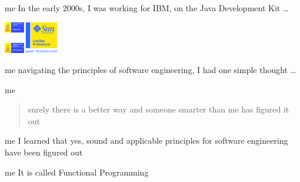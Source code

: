 \begin{frame}
\begin{block}{me}
In the early 2000s, I was working for IBM, on the Java Development Kit \ldots
\end{block}
\includegraphics[height=1.4cm]{image/java-certs.png}
\end{frame}

\begin{frame}
\begin{block}{me}
navigating the principles of software engineering, I had one simple thought \ldots
\end{block}
\end{frame}

\begin{frame}
\begin{block}{me}
\begin{quote}
surely there is a better way and someone smarter than me has figured it out
\end{quote}
\end{block}
\end{frame}

\begin{frame}
\begin{block}{me}
I learned that yes, sound and applicable principles for software engineering have been figured out
\end{block}
\end{frame}

\begin{frame}
\begin{block}{me}
It is called Functional Programming
\end{block}
\end{frame}
